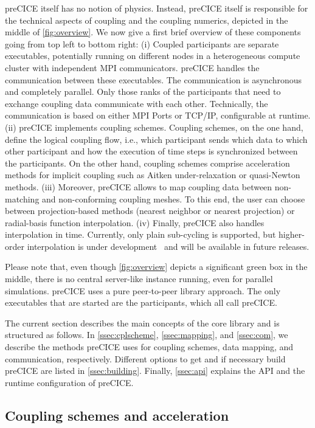 preCICE itself has no notion of physics.
Instead, preCICE itself is responsible for the technical aspects of coupling and the coupling numerics, depicted in the middle of \autoref{fig:overview}. We now give a first brief overview of these components going from top left to bottom right:
(i) Coupled participants are separate executables, potentially running on different nodes in a heterogeneous compute cluster with independent MPI communicators.
preCICE handles the communication between these executables. 
The communication is asynchronous and completely parallel. 
Only those ranks of the participants that need to exchange coupling data communicate with each other.  
Technically, the communication is based on either MPI Ports or TCP/IP, configurable at runtime.
(ii) preCICE implements coupling schemes. Coupling schemes, on the one hand, define the logical coupling flow, i.e., which participant sends which data to which other participant and how the execution of time steps is synchronized between the participants.
On the other hand, coupling schemes comprise acceleration methods for implicit coupling such as Aitken under-relaxation or quasi-Newton methods. 
(iii) Moreover, preCICE allows to map coupling data between non-matching and non-conforming coupling meshes. 
To this end, the user can choose between projection-based methods (nearest neighbor or nearest projection) or radial-basis function interpolation.
(iv) Finally, preCICE also handles interpolation in time.
Currently, only plain sub-cycling is supported, but higher-order interpolation is under development~\cite{QNWI} and will be available in future releases.
 
Please note that, even though \autoref{fig:overview} depicts a significant green box in the middle, there is no central server-like instance running, even for parallel simulations. 
preCICE uses a pure peer-to-peer library approach.
The only executables that are started are the participants, which all call preCICE.

The current section describes the main concepts of the core library and is structured as follows. 
In \autoref{ssec:cplscheme}, \autoref{ssec:mapping}, and \autoref{ssec:com}, we describe the methods preCICE uses for coupling schemes, data mapping, and communication, respectively. Different options to get and if necessary build preCICE are listed in \autoref{ssec:building}. Finally, \autoref{ssec:api} explains the API and the runtime configuration of preCICE.

\subsection{Coupling schemes and acceleration}
\label{ssec:cplscheme}

